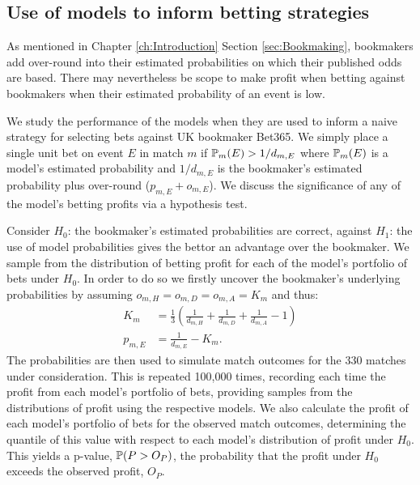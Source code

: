 \subsection{Use of models to inform betting strategies}
\label{sec:Use_of_models_to_inform_betting_strategies}

As mentioned in Chapter \ref{ch:Introduction} Section \ref{sec:Bookmaking}, bookmakers add over-round into their
estimated probabilities on which their published odds are based. There may nevertheless be scope to make profit when
betting against bookmakers when their estimated probability of an event is low.

We study the performance of the models when they are used to inform a naive strategy for selecting bets against UK
bookmaker Bet365. We simply place a single unit bet on event \(E\) in match \(m\) if \(\mathbb{P}_m(E) > 1 / d_{m, E}\)
where \(\mathbb{P}_m(E)\) is a model's estimated probability and \(1 / d_{m, E}\) is the bookmaker's estimated
probability plus over-round (\(p_{m, E} + o_{m, E}\)). We discuss the significance of any of the model's betting profits
via a hypothesis test.

Consider \(H_0\): the bookmaker's estimated probabilities are correct, against \(H_1\): the use of model probabilities
gives the bettor an advantage over the bookmaker. We sample from the distribution of betting profit for each of the
model's portfolio of bets under \(H_0\). In order to do so we firstly uncover the bookmaker's underlying probabilities
by assuming \(o_{m, H} = o_{m, D} = o_{m, A} = K_m\) and thus:
\begin{align} 
K_m      &= \frac{1}{3} \left(\frac{1}{d_{m, H}} + \frac{1}{d_{m, D}} + \frac{1}{d_{m, A}} - 1 \right) \\ 
p_{m, E} &= \frac{1}{d_{m, E}} - K_m.
\end{align}
The probabilities are then used to simulate match outcomes for the 330 matches under consideration. This is repeated
100,000 times, recording each time the profit from each model's portfolio of bets, providing samples from the
distributions of profit using the respective models. We also calculate the profit of each model's portfolio of bets for
the observed match outcomes, determining the quantile of this value with respect to each model's distribution of profit
under \(H_0\).  This yields a p-value, \(\mathbb{P}(P > O_P)\), the probability that the profit under \(H_0\) exceeds
the observed profit, \(O_P\).

